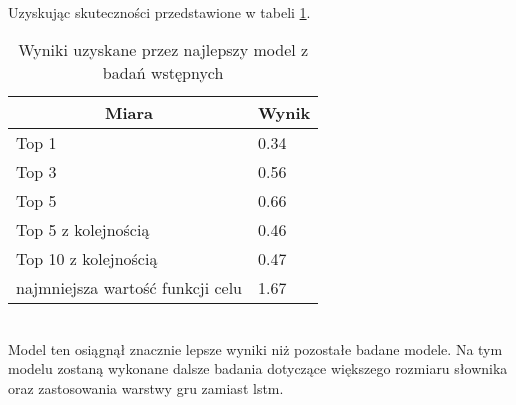 \begin{description}
\begin{table}[ht]
    \label{parametry wstepne}
\end{table} \\\\\\\\\\\\\\\\\\\\\\
Uzyskując skuteczności przedstawione w tabeli \ref{wyniki_najlepszego}. 
\begin{table}[ht]
    \centering
    \begin{tabular}{|l|l|}
        \hline
        \multicolumn{1}{|c|}{Miara}  & Wynik\\ \hline
        Top 1                            & 0.34  \\ \hline
        Top 3                            & 0.56  \\ \hline
        Top 5                            & 0.66  \\ \hline
        Top 5 z kolejnością              & 0.46  \\ \hline
        Top 10 z kolejnością             & 0.47  \\ \hline
        najmniejsza wartość funkcji celu & 1.67  \\ \hline
        \end{tabular}
    \caption{Wyniki uzyskane przez najlepszy model z badań wstępnych} 

    \label{wyniki_najlepszego}
\end{table} \\
Model ten osiągnął znacznie lepsze wyniki niż pozostałe badane modele. Na tym modelu zostaną wykonane dalsze badania 
dotyczące większego rozmiaru słownika oraz zastosowania warstwy gru zamiast lstm. 
\end{description}
